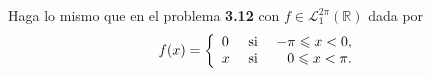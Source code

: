 \documentclass[12pt]{report}
\theoremstyle{largebreak}
\renewcommand{\leq}{\ensuremath{\leqslant}}
\begin{document}
    \begin{sol}
        
    \end{sol}

    \begin{excer}
        Haga lo mismo que en el problema \textbf{3.12} con $f\in\mathcal{L}_1^{2\pi}(\mathbb{R})$ dada por
        \begin{equation*}
            f(x)=\left\{ 
                \begin{array}{lcr}
                    0 & \textup{ si } & -\pi\leq x<0,\\
                    x & \textup{ si } & 0\leq x<\pi.\\
                \end{array}
            \right.
        \end{equation*}
    \end{excer}

    \begin{sol}
        
    \end{sol}
\end{document}
